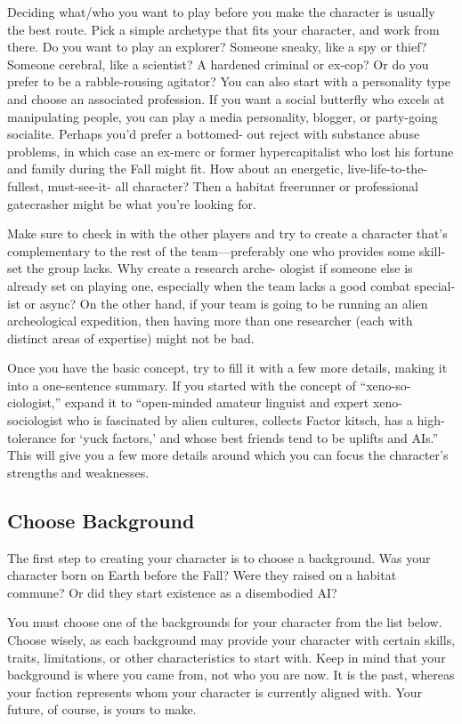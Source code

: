 Deciding what/who you want to play before you make 
the character is usually the best route. Pick a simple 
archetype that fits your character, and work from there. 
Do you want to play an explorer? Someone sneaky, 
like a spy or thief? Someone cerebral, like a scientist? 
A hardened criminal or ex-cop? Or do you prefer to 
be a rabble-rousing agitator? You can also start with a 
personality type and choose an associated profession. If 
you want a social butterfly who excels at manipulating 
people, you can play a media personality, blogger, or 
party-going socialite. Perhaps you'd prefer a bottomed-
out reject with substance abuse problems, in which 
case an ex-merc or former hypercapitalist who lost 
his fortune and family during the Fall might fit. How 
about an energetic, live-life-to-the-fullest, must-see-it-
all character? Then a habitat freerunner or professional 
gatecrasher might be what you're looking for.

Make sure to check in with the other players and 
try to create a character that's complementary to the 
rest of the team—preferably one who provides some 
skill-set the group lacks. Why create a research arche-
ologist if someone else is already set on playing one, 
especially when the team lacks a good combat special-
ist or async? On the other hand, if your team is going 
to be running an alien archeological expedition, then 
having more than one researcher (each with distinct 
areas of expertise) might not be bad.

Once you have the basic concept, try to fill it with 
a few more details, making it into a one-sentence 
summary. If you started with the concept of ``xeno-so-
ciologist,'' expand it to ``open-minded amateur linguist 
and expert xeno-sociologist who is fascinated by alien 
cultures, collects Factor kitsch, has a high-tolerance 
for ‘yuck factors,' and whose best friends tend to be 
uplifts and AIs.'' This will give you a few more details 
around which you can focus the character's strengths 
and weaknesses.

\subsection{Choose Background}

The first step to creating your character is to choose a 
background. Was your character born on Earth before 
the Fall? Were they raised on a habitat commune? Or 
did they start existence as a disembodied AI?

You must choose one of the backgrounds for your 
character from the list below. Choose wisely, as each 
background may provide your character with certain 
skills, traits, limitations, or other characteristics to 
start with. Keep in mind that your background is 
where you came from, not who you are now. It is 
the past, whereas your faction represents whom your 
character is currently aligned with. Your future, of 
course, is yours to make.

